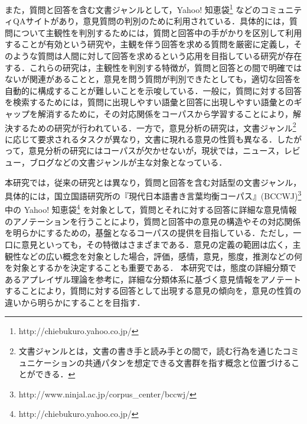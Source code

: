 \documentclass[japanese]{jnlp_1.4}
\begin{document}
また，質問と回答を含む文書ジャンルとして，Yahoo! 知恵袋\footnote{http://chiebukuro.yahoo.co.jp/} などのコミュニティQAサイトがあり，意見質問の判別のために利用されている．具体的には，質問について主観性を判別するためには，質問と回答中の手がかりを区別して利用することが有効という研究\cite{li2008sigir}や，主観を伴う回答を求める質問を厳密に定義し，そのような質問は人間に対して回答を求めるという応用を目指している研究が存在する\cite{aikawa2011tod}．これらの研究は，主観性を判別する特徴が，質問と回答との間で明確ではないが関連があることと，意見を問う質問が判別できたとしても，適切な回答を自動的に構成することが難しいことを示唆している．一般に，質問に対する回答を検索するためには，質問に出現しやすい語彙と回答に出現しやすい語彙とのギャップを解消するために，その対応関係をコーパスから学習することにより，解決するための研究が行われている\cite{abe2011yans,berger2000sigir}．一方で，意見分析の研究は，文書ジャンル\footnote{文書ジャンルとは，文書の書き手と読み手との間で，読む行為を通じたコミュニケーションの共通パタンを想定できる文書群を指す概念と位置づけることができる\cite{bazerman2004}．} に応じて要求されるタスクが異なり，文書に現れる意見の性質も異なる．したがって，意見分析の研究にはコーパスが欠かせないが，現状では，ニュース，レビュー，ブログなどの文書ジャンルが主な対象となっている\cite{seki2013tod}．

本研究では，従来の研究とは異なり，質問と回答を含む対話型の文書ジャンル，具体的には，国立国語研究所の『現代日本語書き言葉均衡コーパス』(BCCWJ)\cite{maekawa2011bccwj,yamasaki2011bccwj,bccwj2012}\footnote{http://www.ninjal.ac.jp/corpus\_center/bccwj/} 中の Yahoo! 知恵袋\footnote{http://chiebukuro.yahoo.co.jp/} を対象として，質問とそれに対する回答に詳細な意見情報のアノテーションを行うことにより，質問と回答中の意見の構造やその対応関係を明らかにするための，基盤となるコーパスの提供を目指している．ただし，一口に意見といっても，その特徴はさまざまである．意見の定義の範囲は広く，主観性などの広い概念を対象とした場合，評価，感情，意見，態度，推測などの何を対象とするかを決定することも重要である\cite{wiebe2005lre,koba2006signl}．
本研究では，態度の詳細分類であるアプレイザル理論\cite{martin2005}を参考に，詳細な分類体系に基づく意見情報をアノテートすることにより，質問に対する回答として出現する意見の傾向を，意見の性質の違いから明らかにすることを目指す．
\end{document}
